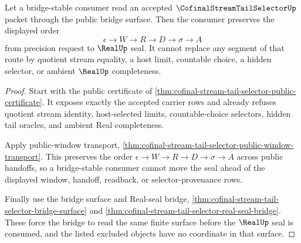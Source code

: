 \begin{theorem}
\label{thm:cofinal-stream-tail-selector-bridge-stability}
Let a bridge-stable consumer read an accepted $\CofinalStreamTailSelectorUp$ packet through the public bridge surface. Then the consumer preserves the displayed order
$$
\epsilon \to W \to R \to D \to \sigma \to A
$$
from precision request to $\RealUp$ seal. It cannot replace any segment of that route by quotient stream equality, a host limit, countable choice, a hidden selector, or ambient $\RealUp$ completeness.
\end{theorem}
\begin{proof}
Start with the public certificate of \autoref{thm:cofinal-stream-tail-selector-public-certificate}. It exposes exactly the accepted carrier rows and already refuses quotient stream identity, host-selected limits, countable-choice selectors, hidden tail oracles, and ambient Real completeness.

Apply public-window transport, \autoref{thm:cofinal-stream-tail-selector-public-window-transport}. This preserves the order $\epsilon \to W \to R \to D \to \sigma \to A$ across public handoffs, so a bridge-stable consumer cannot move the seal ahead of the displayed window, handoff, readback, or selector-provenance rows.

Finally use the bridge surface and Real-seal bridge, \autoref{thm:cofinal-stream-tail-selector-bridge-surface} and \autoref{thm:cofinal-stream-tail-selector-real-seal-bridge}. These force the bridge to read the same finite surface before the $\RealUp$ seal is consumed, and the listed excluded objects have no coordinate in that surface.
\end{proof}



